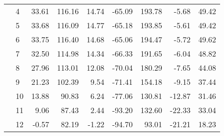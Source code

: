 \begin{table}
\begin{tabular}{l|l|rrrrrrr}
 & 4 & 33.61 & 116.16 & 14.74 & -65.09 & 193.78 & -5.68 & 49.42 \\
 & 5 & 33.68 & 116.09 & 14.77 & -65.18 & 193.85 & -5.61 & 49.42 \\
 & 6 & 33.75 & 116.40 & 14.68 & -65.06 & 194.47 & -5.72 & 49.62 \\
 & 7 & 32.50 & 114.98 & 14.34 & -66.33 & 191.65 & -6.04 & 48.82 \\
 & 8 & 27.96 & 113.01 & 12.08 & -70.04 & 180.29 & -7.65 & 44.08 \\
 & 9 & 21.23 & 102.39 & 9.54 & -71.41 & 154.18 & -9.15 & 37.44 \\
 & 10 & 13.88 & 90.83 & 6.24 & -77.06 & 130.81 & -12.87 & 31.46 \\
 & 11 & 9.06 & 87.43 & 2.44 & -93.20 & 132.60 & -22.33 & 33.04 \\
 & 12 & -0.57 & 82.19 & -1.22 & -94.70 & 93.01 & -21.21 & 18.23 \\
\cline{1-9}
\bottomrule
\end{tabular}
\end{table}
